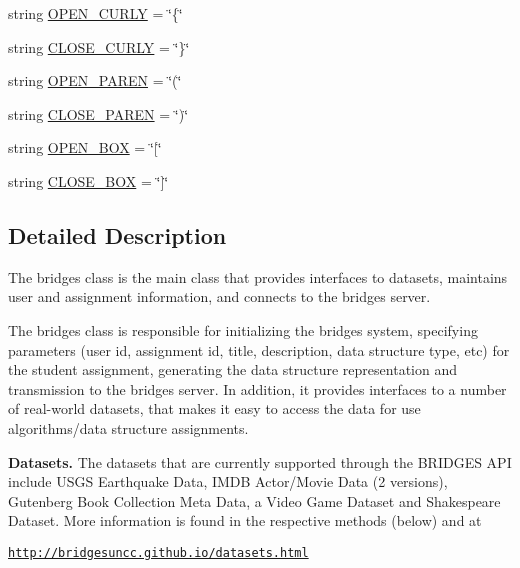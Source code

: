 \begin{DoxyCompactItemize}
\item 
string \hyperlink{class_bridges_1_1bridges_1_1_bridges_a2553c7dc637582bfd38998ee5c2a7f2b}{O\+P\+E\+N\+\_\+\+C\+U\+R\+L\+Y} = \char`\"{}\{\char`\"{}
\item 
string \hyperlink{class_bridges_1_1bridges_1_1_bridges_ac4c7b26ef4e060229b1449ab73500cfb}{C\+L\+O\+S\+E\+\_\+\+C\+U\+R\+L\+Y} = \char`\"{}\}\char`\"{}
\item 
string \hyperlink{class_bridges_1_1bridges_1_1_bridges_a1cd80e923a43de668fe44b606264b290}{O\+P\+E\+N\+\_\+\+P\+A\+R\+E\+N} = \char`\"{}(\char`\"{}
\item 
string \hyperlink{class_bridges_1_1bridges_1_1_bridges_a0b250d3bfad480552ff46884310ac6d1}{C\+L\+O\+S\+E\+\_\+\+P\+A\+R\+E\+N} = \char`\"{})\char`\"{}
\item 
string \hyperlink{class_bridges_1_1bridges_1_1_bridges_ae766e7f43cc4c93ff14abff689aa6612}{O\+P\+E\+N\+\_\+\+B\+O\+X} = \char`\"{}\mbox{[}\char`\"{}
\item 
string \hyperlink{class_bridges_1_1bridges_1_1_bridges_ae389d89d8512b2c481da3c165cac4c33}{C\+L\+O\+S\+E\+\_\+\+B\+O\+X} = \char`\"{}\mbox{]}\char`\"{}
\end{DoxyCompactItemize}


\subsection{Detailed Description}
The bridges class is the main class that provides interfaces to datasets, maintains user and assignment information, and connects to the bridges server. 

The bridges class is responsible for initializing the bridges system, specifying parameters (user id, assignment id, title, description, data structure type, etc) for the student assignment, generating the data structure representation and transmission to the bridges server. In addition, it provides interfaces to a number of real-\/world datasets, that makes it easy to access the data for use algorithms/data structure assignments. ~\newline


{\bfseries Datasets.} The datasets that are currently supported through the B\+R\+I\+D\+G\+E\+S A\+P\+I include U\+S\+G\+S Earthquake Data, I\+M\+D\+B Actor/\+Movie Data (2 versions), Gutenberg Book Collection Meta Data, a Video Game Dataset and Shakespeare Dataset. More information is found in the respective methods (below) and at 

\href{http://bridgesuncc.github.io/datasets.html}{\tt http\+://bridgesuncc.\+github.\+io/datasets.\+html} 


